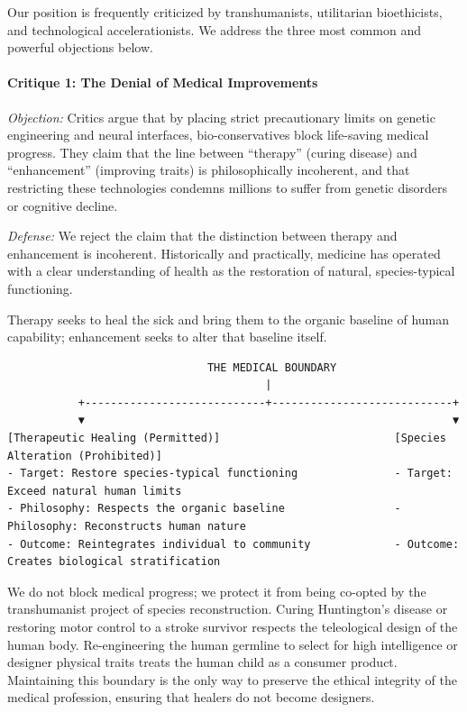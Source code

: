 Our position is frequently criticized by transhumanists, utilitarian
bioethicists, and technological accelerationists. We address the three
most common and powerful objections below.

\paragraph{Critique 1: The Denial of Medical
Improvements}\label{critique-1-the-denial-of-medical-improvements}

\emph{Objection:} Critics argue that by placing strict precautionary
limits on genetic engineering and neural interfaces, bio-conservatives
block life-saving medical progress. They claim that the line between
``therapy'' (curing disease) and ``enhancement'' (improving traits) is
philosophically incoherent, and that restricting these technologies
condemns millions to suffer from genetic disorders or cognitive decline.

\emph{Defense:} We reject the claim that the distinction between therapy
and enhancement is incoherent. Historically and practically, medicine
has operated with a clear understanding of health as the restoration of
natural, species-typical functioning.

Therapy seeks to heal the sick and bring them to the organic baseline of
human capability; enhancement seeks to alter that baseline itself.

\begin{verbatim}
                               THE MEDICAL BOUNDARY
                                        |
           +----------------------------+----------------------------+
           ▼                                                         ▼
[Therapeutic Healing (Permitted)]                           [Species Alteration (Prohibited)]
- Target: Restore species-typical functioning               - Target: Exceed natural human limits
- Philosophy: Respects the organic baseline                 - Philosophy: Reconstructs human nature
- Outcome: Reintegrates individual to community             - Outcome: Creates biological stratification
\end{verbatim}

We do not block medical progress; we protect it from being co-opted by
the transhumanist project of species reconstruction. Curing Huntington's
disease or restoring motor control to a stroke survivor respects the
teleological design of the human body. Re-engineering the human germline
to select for high intelligence or designer physical traits treats the
human child as a consumer product. Maintaining this boundary is the only
way to preserve the ethical integrity of the medical profession,
ensuring that healers do not become designers.

